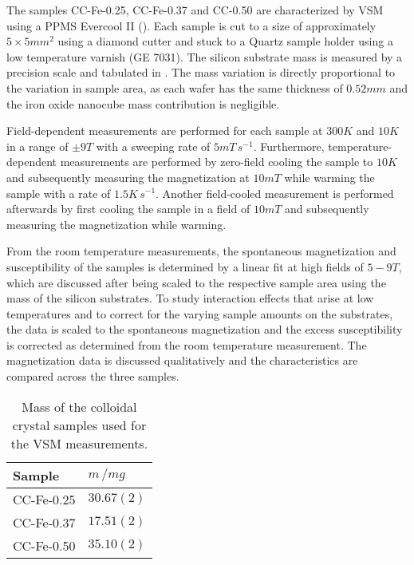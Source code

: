 \documentclass[\main/dresen_thesis.tex]{subfiles}
\begin{document}
    The samples CC-Fe-0.25, CC-Fe-0.37 and CC-0.50 are characterized by VSM using a PPMS Evercool II ().
    Each sample is cut to a size of approximately $5 \times 5 \unit{mm^2}$ using a diamond cutter and stuck to a Quartz sample holder using a low temperature varnish (GE 7031).
    The silicon substrate mass is measured by a precision scale and tabulated in .
    The mass variation is directly proportional to the variation in sample area, as each wafer has the same thickness of $0.52 \unit{mm}$ and the iron oxide nanocube mass contribution is negligible.

    Field-dependent measurements are performed for each sample at $300 \unit{K}$ and $10 \unit{K}$ in a range of $\pm 9 \unit{T}$ with a sweeping rate of $5 \unit{mT \, s^{-1}}$.
    Furthermore, temperature-dependent measurements are performed by zero-field cooling the sample to $10 \unit{K}$ and subsequently measuring the magnetization at $10 \unit{mT}$ while warming the sample with a rate of $1.5 \unit{K \, s^{-1}}$.
    Another field-cooled measurement is performed afterwards by first cooling the sample in a field of $10 \unit{mT}$ and subsequently measuring the magnetization while warming.

    From the room temperature measurements, the spontaneous magnetization and susceptibility of the samples is determined by a linear fit at high fields of $5 - 9 \unit{T}$, which are discussed after being scaled to the respective sample area using the mass of the silicon substrates.
    To study interaction effects that arise at low temperatures and to correct for the varying sample amounts on the substrates, the data is scaled to the spontaneous magnetization and the excess susceptibility is corrected as determined from the room temperature measurement.
    The magnetization data is discussed qualitatively and the characteristics are compared across the three samples.

    \begin{table}[htbp]
      \centering
      \caption{\label{tab:colloidalCrystals:layerCharacterization:ppmsMasses}Mass of the colloidal crystal samples used for the VSM measurements.}
      \begin{tabular}{ l | l}
        \rule{0pt}{2ex} \textbf{Sample}  & $m \, / \unit{mg}$ \\
        \hline
        \rule{0pt}{2ex} CC-Fe-0.25   & $30.67(2)$ \\
        \rule{0pt}{2ex} CC-Fe-0.37   & $17.51(2)$ \\
        \rule{0pt}{2ex} CC-Fe-0.50   & $35.10(2)$ \\
        \hline
      \end{tabular}
    \end{table}
\end{document}
